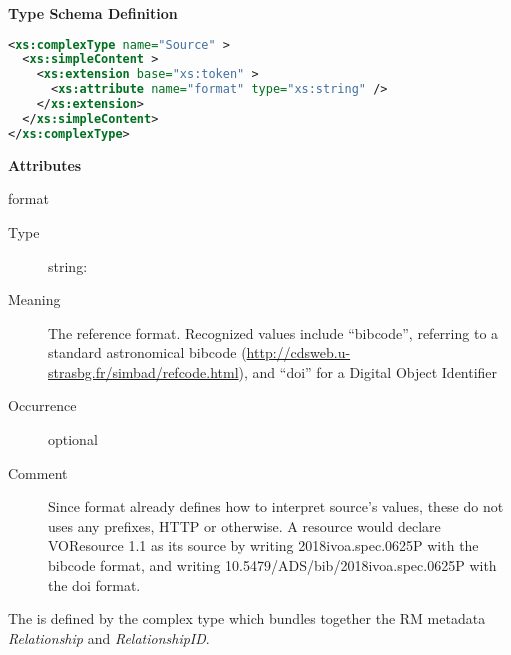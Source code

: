 \documentclass[11pt,a4paper]{ivoa}
\begin{document}
\begin{generated}
\begingroup
        \renewcommand*\descriptionlabel[1]{%
        \hbox to 5.5em{\emph{#1}\hfil}}\vspace{1ex}\noindent\textbf{ Type Schema Definition}

\begin{lstlisting}[language=XML,basicstyle=\footnotesize]
<xs:complexType name="Source" >
  <xs:simpleContent >
    <xs:extension base="xs:token" >
      <xs:attribute name="format" type="xs:string" />
    </xs:extension>
  </xs:simpleContent>
</xs:complexType>
\end{lstlisting}

\vspace{0.5ex}\noindent\textbf{ Attributes}

\begingroup\small\begin{bigdescription}
\item[format]
\begin{description}
\item[Type] string: 
\item[Meaning]
                 The reference format.  Recognized values include “bibcode”,
                 referring to a standard astronomical bibcode
                 (\url{http://cdsweb.u-strasbg.fr/simbad/refcode.html}), and
                 “doi” for a Digital Object Identifier

\item[Occurrence] optional
\item[Comment]
               	Since format already defines how to interpret source's
               	values, these do not uses any prefixes, HTTP or otherwise.
               	A resource would declare VOResource 1.1 as its source by
               	writing 2018ivoa.spec.0625P with the bibcode format, and
               	writing 10.5479/ADS/bib/2018ivoa.spec.0625P with the doi
               	format.

\end{description}


\end{bigdescription}\endgroup

\endgroup
\end{generated}



The  is defined by the
 complex type which bundles together the
RM metadata \emph{Relationship} and
\emph{RelationshipID}.
\end{document}
